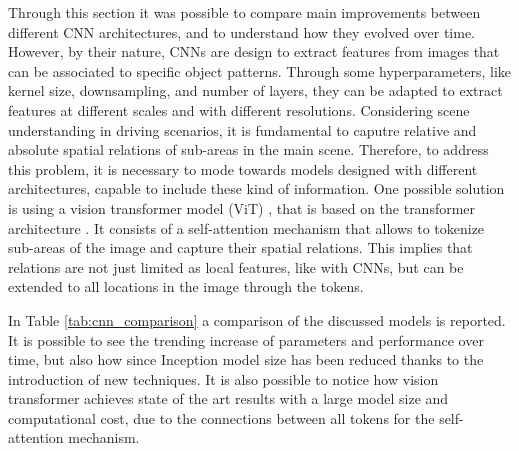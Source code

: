 Through this section it was possible to compare main improvements between 
different CNN architectures, and to understand how they evolved over time.
However, by their nature, CNNs are design to extract features from images that 
can be associated to specific object patterns. Through some hyperparameters, 
like kernel size, downsampling, and number of layers, they can be adapted to extract 
features at different scales and with different resolutions. Considering scene 
understanding in driving scenarios, it is fundamental to caputre relative and 
absolute spatial relations of sub-areas in the main scene. 
Therefore, to address this problem, it is necessary to mode towards models 
designed with different architectures, capable to include these kind of 
information. One possible solution is using a vision transformer model (ViT)
\cite{vit}, that is based on the transformer architecture 
\cite{attention_is_all_you_need}. It consists of a 
self-attention mechanism that allows to tokenize sub-areas of the image and 
capture their spatial relations. This implies that relations are not just 
limited as local features, like with CNNs, but can be extended to all locations 
in the image through the tokens.

In Table \ref{tab:cnn_comparison} a comparison of the discussed models is 
reported. It is possible to see the trending increase of parameters and 
performance over time, but also how since Inception model size has been reduced 
thanks to the introduction of new techniques. It is also possible to notice 
how vision transformer achieves state of the art results with a large model 
size and computational cost, due to the connections between all tokens for 
the self-attention mechanism.

